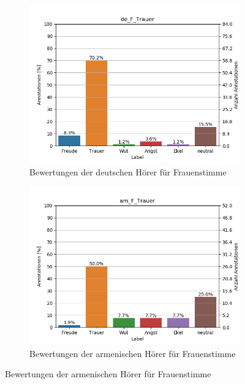 \documentclass[11pt,a4paper,headsepline,twoside,toc=bibliography]{scrreprt}
\begin{document}
\begin{figure}[t!] %
	\begin{subfigure}{0.48\textwidth}
		\includegraphics[width=\linewidth]{plots/de_F_Trauer.png}
		\caption{Bewertungen der deutschen Hörer für Frauenstimme} \label{fig:de_f_T}
	\end{subfigure}\hspace*{\fill}
	\begin{subfigure}{0.48\textwidth}
		\includegraphics[width=\linewidth]{plots/am_F_Trauer.png}
		\caption{Bewertungen der armenischen Hörer für Frauenstimme} \label{fig:am_f_T}
	\end{subfigure}
	

\end{figure}
\end{document}
